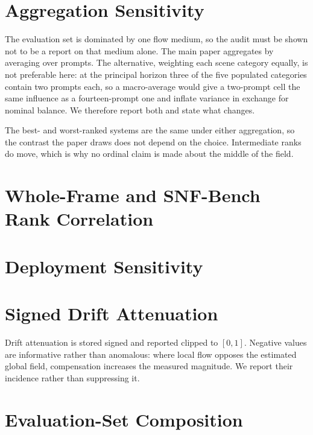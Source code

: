 \documentclass[10pt,twocolumn,letterpaper]{article}
\begin{document}
\section{Aggregation Sensitivity}
\label{sup:aggregation}

The evaluation set is dominated by one flow medium, so the audit must be shown
not to be a report on that medium alone. The main paper aggregates by averaging
over prompts. The alternative, weighting each scene category equally, is not
preferable here: at the principal horizon three of the five populated categories
contain two prompts each, so a macro-average would give a two-prompt cell the
same influence as a fourteen-prompt one and inflate variance in exchange for
nominal balance. We therefore report both and state what changes.

The best- and worst-ranked systems are the same under either aggregation, so the
contrast the paper draws does not depend on the choice. Intermediate ranks do
move, which is why no ordinal claim is made about the middle of the field.



\section{Whole-Frame and SNF-Bench Rank Correlation}
\label{sup:disagreement}




\section{Deployment Sensitivity}
\label{sup:deployment}



\section{Signed Drift Attenuation}
\label{sup:dar}



Drift attenuation is stored signed and reported clipped to $[0,1]$. Negative
values are informative rather than anomalous: where local flow opposes the
estimated global field, compensation increases the measured magnitude. We report
their incidence rather than suppressing it.

\section{Evaluation-Set Composition}
\label{sup:categories}
\end{document}
